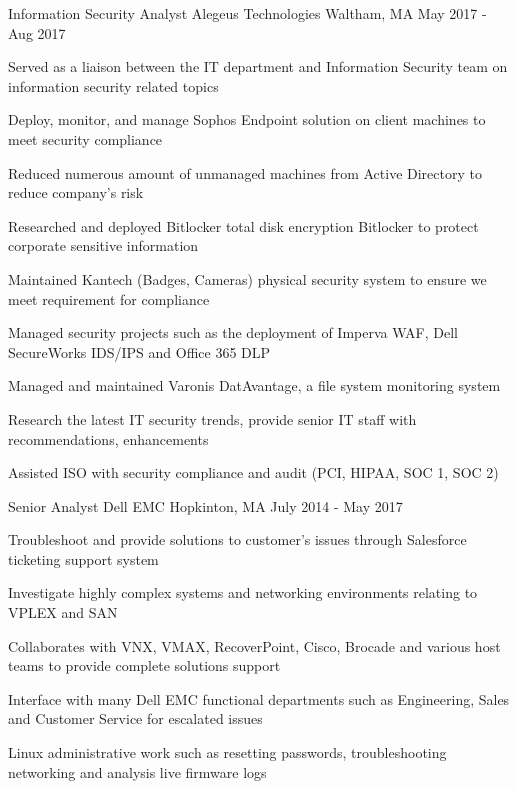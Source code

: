\begin{cventries}
  \cventry
    {Information Security Analyst} %
    {Alegeus Technologies} %
    {Waltham, MA} %
    {May 2017 - Aug 2017} %
    {
      \begin{cvitems} %
        \item {Served as a liaison between the IT department and Information Security team on information security related
        topics}
        \item {Deploy, monitor, and manage Sophos Endpoint solution on client machines to meet security compliance}
        \item {Reduced numerous amount of unmanaged machines from Active Directory to reduce company’s risk}
        \item {Researched and deployed Bitlocker total disk encryption Bitlocker to protect corporate sensitive information}
        \item {Maintained Kantech (Badges, Cameras) physical security system to ensure we meet requirement for
        compliance}
        \item {Managed security projects such as the deployment of Imperva WAF, Dell SecureWorks IDS/IPS and Office
        365 DLP}
        \item {Managed and maintained Varonis DatAvantage, a file system monitoring system}
        \item {Research the latest IT security trends, provide senior IT staff with recommendations, enhancements}
        \item {Assisted ISO with security compliance and audit (PCI, HIPAA, SOC 1, SOC 2)}
      \end{cvitems}
    }

  \cventry
    {Senior Analyst} %
    {Dell EMC} %
    {Hopkinton, MA} %
    {July 2014 - May 2017} %
    {
      \begin{cvitems} %
        \item {Troubleshoot and provide solutions to customer’s issues through Salesforce ticketing support system}
		    \item {Investigate highly complex systems and networking environments relating to VPLEX and SAN}
        \item {Collaborates with VNX, VMAX, RecoverPoint, Cisco, Brocade and various host teams to provide complete
        solutions support}
        \item {Interface with many Dell EMC functional departments such as Engineering, Sales and Customer Service for
        escalated issues}
        \item {Linux administrative work such as resetting passwords, troubleshooting networking and analysis live firmware
        logs}
      \end{cvitems}
    }


\end{cventries}
